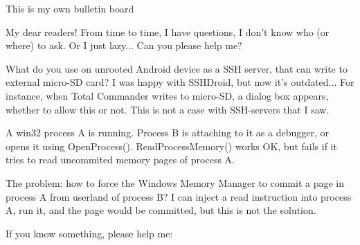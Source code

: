 
\begin{center}
\LARGE{} This is my own bulletin board \normalsize{}
\end{center}

My dear readers! From time to time, I have questions, I don't know who (or where) to ask.
Or I just lazy...
Can you please help me?

\myhrule{}

What do you use on unrooted Android device as a SSH server, that can write to external micro-SD card?
I was happy with SSHDroid, but now it's outdated...
For instance, when Total Commander writes to micro-SD, a dialog box appears, whether to allow this or not.
This is not a case with SSH-servers that I saw.

\myhrule{}

A win32 process A is running.
Process B is attaching to it as a debugger, or opens it using OpenProcess().
ReadProcessMemory() works OK, but fails if it tries to read uncommited memory pages of process A.

The problem: how to force the Windows Memory Manager to commit a page in process A from userland of process B?
I can inject a read instruction into process A, run it, and the page would be committed, but this is not the solution.

\myhrule{}

If you know something, please help me: \EMAIL{}

